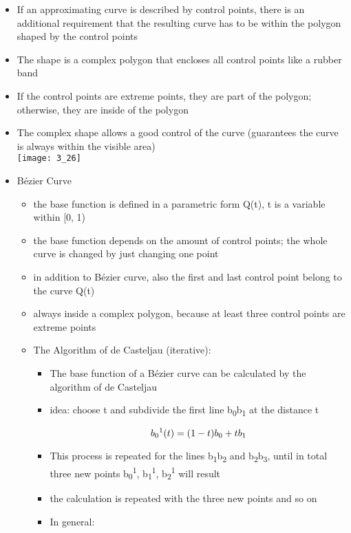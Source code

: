 \documentclass{standalone}
\begin{document}
\begin{itemize}
	\item If an approximating curve is described by control points, there is an additional requirement that the resulting curve has to be within the polygon shaped by the control points
	\item The shape is a complex polygon that encloses all control points like a rubber band
	\item If the control points are extreme points, they are part of the polygon; otherwise, they are inside of the polygon
	\item The complex shape allows a good control of the curve (guarantees the curve is always within the visible area)\\
\texttt{[image: 3\_26]}
	\item B\'ezier Curve
	\begin{itemize}
		\item the base function is defined in a parametric form Q(t), t is a variable within [0, 1)
		\item the base function depends on the amount of control points; the whole curve is changed by just changing one point
		\item in addition to B\'ezier curve, also the first and last control point belong to the curve Q(t)
		\item always inside a complex polygon, because at least three control points are extreme points
		\item The Algorithm of de Casteljau (iterative):
			\begin{itemize}
				\item The base function of a B\'ezier curve can be calculated by the algorithm of de Casteljau
				\item idea: choose t and subdivide the first line b\textsubscript{0}b\textsubscript{1} at the distance t

				\begin{equation}
					b\textsubscript{0}\textsuperscript{1}(t) = (1-t)b\textsubscript{0}+t b\textsubscript{1}
				\end{equation}
				\item This process is repeated for the lines b\textsubscript{1}b\textsubscript{2} and b\textsubscript{2}b\textsubscript{3}, until in total three new points b\textsubscript{0}\textsuperscript{1}, b\textsubscript{1}\textsuperscript{1}, b\textsubscript{2}\textsuperscript{1} will result 
				\item the calculation is repeated with the three new points and so on 
				\item In general:


\end{itemize}
\end{itemize}
\end{itemize}
\end{document}

